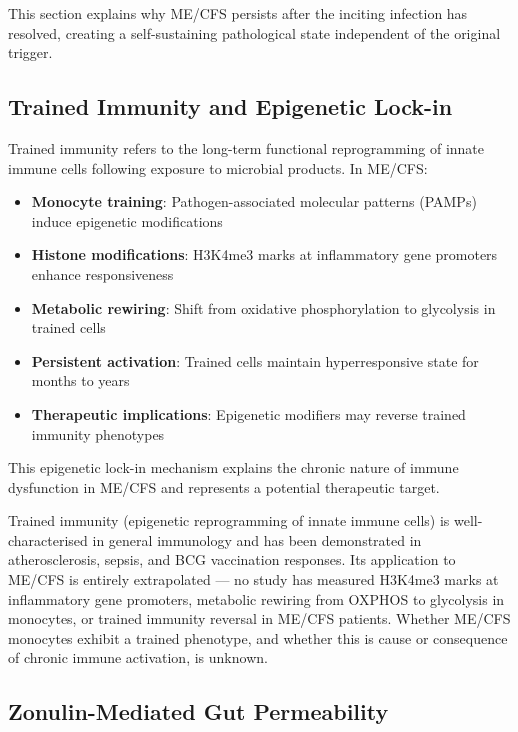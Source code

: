 This section explains why ME/CFS persists after the inciting infection has resolved, creating a self-sustaining pathological state independent of the original trigger.

\subsection{Trained Immunity and Epigenetic Lock-in}
\label{sec:trained-immunity}

Trained immunity refers to the long-term functional reprogramming of innate immune cells following exposure to microbial products. In ME/CFS:

\begin{itemize}
    \item \textbf{Monocyte training}: Pathogen-associated molecular patterns (PAMPs) induce epigenetic modifications
    \item \textbf{Histone modifications}: H3K4me3 marks at inflammatory gene promoters enhance responsiveness
    \item \textbf{Metabolic rewiring}: Shift from oxidative phosphorylation to glycolysis in trained cells
    \item \textbf{Persistent activation}: Trained cells maintain hyperresponsive state for months to years
    \item \textbf{Therapeutic implications}: Epigenetic modifiers may reverse trained immunity phenotypes
\end{itemize}

This epigenetic lock-in mechanism explains the chronic nature of immune dysfunction in ME/CFS and represents a potential therapeutic target.

\begin{limitation}
Trained immunity (epigenetic reprogramming of innate immune cells) is well-characterised in general immunology and has been demonstrated in atherosclerosis, sepsis, and BCG vaccination responses. Its application to ME/CFS is entirely extrapolated --- no study has measured H3K4me3 marks at inflammatory gene promoters, metabolic rewiring from OXPHOS to glycolysis in monocytes, or trained immunity reversal in ME/CFS patients. Whether ME/CFS monocytes exhibit a trained phenotype, and whether this is cause or consequence of chronic immune activation, is unknown.
\end{limitation}

\subsection{Zonulin-Mediated Gut Permeability}
\label{sec:zonulin-permeability}

